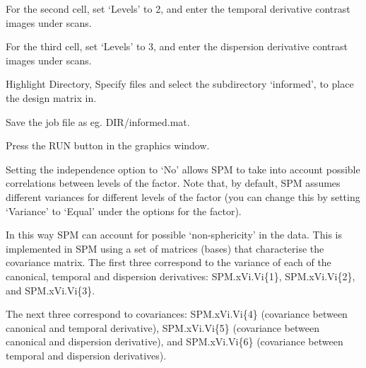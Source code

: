 \item{For the second cell, set `Levels' to 2, and enter the 
temporal derivative contrast images under scans.}   
\item{For the third cell, set `Levels' to 3, and enter the 
dispersion derivative contrast images under scans.}               \item{Highlight Directory, Specify files and select the 
subdirectory `informed', to place the design matrix in.}
\item{Save the job file as eg. {\sf DIR/informed.mat}}.
\item{Press the RUN button in the graphics window.}
\ei

Setting the independence option to `No' allows SPM to take into account possible correlations between levels of the factor. Note that, by default, SPM assumes different variances 
for different levels of the factor (you can change this by setting `Variance' to `Equal' under the options for the factor). 

In this way SPM can account for possible `non-sphericity' in the data. This is implemented in SPM using a set of matrices (bases) that characterise the covariance matrix. The first three correspond to the variance of each of the canonical, temporal and dispersion derivatives:  SPM.xVi.Vi\{1\}, SPM.xVi.Vi\{2\}, and SPM.xVi.Vi\{3\}.

The next three correspond to covariances: SPM.xVi.Vi\{4\} (covariance between canonical and temporal derivative), SPM.xVi.Vi\{5\} (covariance between canonical and dispersion derivative), and SPM.xVi.Vi\{6\} (covariance between temporal and dispersion 
derivatives).

